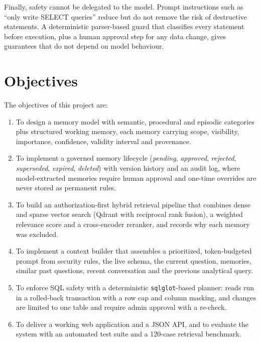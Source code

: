 Finally, safety cannot be delegated to the model. Prompt instructions such as ``only write
SELECT queries'' reduce but do not remove the risk of destructive statements. A
deterministic parser-based guard that classifies every statement before execution, plus a
human approval step for any data change, gives guarantees that do not depend on model
behaviour.

\section{Objectives}
The objectives of this project are:

\begin{enumerate}[label=\arabic*., leftmargin=*, topsep=4pt, itemsep=4pt]
    \item To design a memory model with semantic, procedural and episodic categories plus
          structured working memory, each memory carrying scope, visibility, importance,
          confidence, validity interval and provenance.
    \item To implement a governed memory lifecycle (\textit{pending}, \textit{approved},
          \textit{rejected}, \textit{superseded}, \textit{expired}, \textit{deleted}) with
          version history and an audit log, where model-extracted memories require human
          approval and one-time overrides are never stored as permanent rules.
    \item To build an authorization-first hybrid retrieval pipeline that combines dense and
          sparse vector search (Qdrant with reciprocal rank fusion), a weighted relevance
          score and a cross-encoder reranker, and records why each memory was excluded.
    \item To implement a context builder that assembles a prioritized, token-budgeted prompt
          from security rules, the live schema, the current question, memories, similar
          past questions, recent conversation and the previous analytical query.
    \item To enforce SQL safety with a deterministic \texttt{sqlglot}-based planner: reads
          run in a rolled-back transaction with a row cap and column masking, and changes
          are limited to one table and require admin approval with a re-check.
    \item To deliver a working web application and a JSON API, and to evaluate the system
          with an automated test suite and a 120-case retrieval benchmark.
\end{enumerate}


